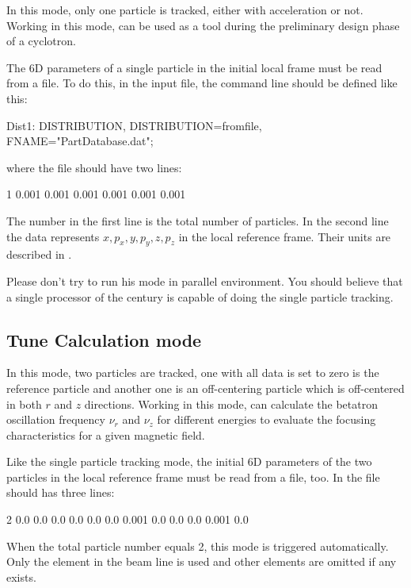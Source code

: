   In this mode, only one particle is tracked, either with acceleration or not.  Working in this mode, \opalcycl
  can be used as a tool during the preliminary design phase of a cyclotron.

  The 6D parameters of a single particle in the initial local frame must be read from a file. To do this, in the \opal input file,
  the command line   should be defined like this:
\begin{example}
  Dist1: DISTRIBUTION, DISTRIBUTION=fromfile, FNAME="PartDatabase.dat";
\end{example}
 where the file  should have two lines:
\begin{example}
 1
 0.001 0.001   0.001   0.001   0.001  0.001
\end{example}
The number in the first line is the total number of particles.
In the second line the data represents $x, p_x, y,$$ p_y, z, p_z$ in the local reference frame. Their units are described in .

Please don't try to run his mode in parallel environment. You should believe that a single processor of the  century is capable of doing
the single particle tracking.

\subsection{Tune Calculation mode}

  In this mode, two particles are tracked, one with all data is set to zero is the reference particle and another one is an off-centering particle
  which is off-centered in both $r$ and $z$ directions. Working in this mode, \opalcycl can calculate the betatron oscillation frequency $\nu_r$ and $\nu_z$ for different energies to evaluate the focusing characteristics
  for a given magnetic field.

  Like the single particle tracking mode,
  the initial 6D parameters of the two particles in the local reference frame must be read from a file, too.
  In the file should has three lines:
\begin{example}
 2
 0.0   0.0   0.0   0.0   0.0   0.0
 0.001 0.0   0.0   0.0   0.001  0.0
\end{example}

When the total particle number equals 2, this mode is triggered automatically.
Only the element  in the beam line is used and other elements are omitted if any exists.


